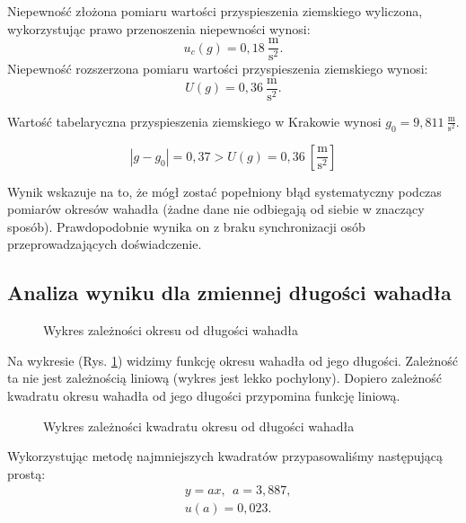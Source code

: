 \documentclass[12pt,a4paper]{article}
\begin{document}
Niepewność złożona pomiaru wartości przyspieszenia ziemskiego wyliczona, wykorzystując prawo przenoszenia niepewności wynosi:
\begin{equation}
	u_c(g) = 0,18~\frac{\textrm{m}}{\textrm{s}^2}.
\end{equation}
Niepewność rozszerzona pomiaru wartości przyspieszenia ziemskiego wynosi:
\begin{equation}
	U(g) = 0,36~\frac{\textrm{m}}{\textrm{s}^2}.
\end{equation}

Wartość tabelaryczna przyspieszenia ziemskiego w Krakowie wynosi $g_0 = 9,811~\frac{\textrm{m}}{\textrm{s}^2}$.

\begin{equation}
	|g - g_0| = 0,37 > U(g) = 0,36~[\frac{\textrm{m}}{\textrm{s}^2}]
	\label{eq:gconst}
\end{equation}

Wynik wskazuje na to, że mógł zostać popełniony błąd systematyczny podczas pomiarów okresów wahadła (żadne dane nie odbiegają od siebie w znaczący sposób). Prawdopodobnie wynika on z braku synchronizacji osób przeprowadzających doświadczenie.


\subsection{Analiza wyniku dla zmiennej długości wahadła}
\begin{figure}[!ht]
	\centering

	\caption{Wykres zależności okresu od długości wahadła}
	\label{fig:img2}
\end{figure}
\pagebreak
Na wykresie (Rys. \ref{fig:img2}) widzimy funkcję okresu wahadła od jego długości. Zależność ta nie jest zależnością liniową (wykres jest lekko pochylony). Dopiero zależność kwadratu okresu wahadła od jego długości przypomina funkcję liniową. 

\begin{figure}[!ht]
	\centering

	\caption{Wykres zależności kwadratu okresu od długości wahadła}
	\label{fig:img3}
\end{figure}


Wykorzystując metodę najmniejszych kwadratów przypasowaliśmy następującą prostą:
\begin{equation}
	\begin{split}
	&y = ax,~~ a = 3,887,\\ 
	&u(a) = 0,023.
	\end{split}
\end{equation}
\end{document}
